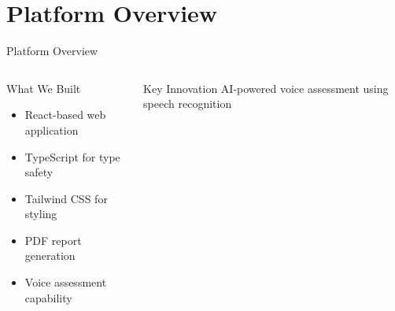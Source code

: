 \documentclass[aspectratio=169]{beamer}
\begin{document}
\section{Platform Overview}
\begin{frame}{Platform Overview}
    \begin{columns}[T]
        \begin{block}{What We Built}
            \begin{itemize}
                \item React-based web application
                \item TypeScript for type safety
                \item Tailwind CSS for styling
                \item PDF report generation
                \item Voice assessment capability
            \end{itemize}
        \end{block}
        
        \begin{center}
            \vspace{0.3cm}
            \begin{alertblock}{Key Innovation}
                AI-powered voice assessment using speech recognition
            \end{alertblock}
        \end{center}
    \end{columns}
\end{frame}

\end{document}
